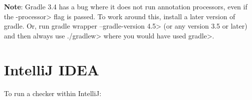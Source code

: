 \textbf{Note}: Gradle 3.4 has a bug where it does not run annotation processors,
even if the \<-processor> flag is passed.
To work around this, install a later version of gradle.  Or, run
\<gradle wrapper --gradle-version 4.5> (or any version 3.5 or later) and
then always use \<./gradlew> where you would have used \<gradle>.




\section{IntelliJ IDEA\label{intellij}}


To run a checker within IntelliJ:

